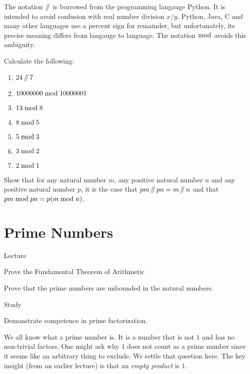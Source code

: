 The notation $\mathop{/\mkern-5mu/}$ is borrowed from the programming langauge Python. It is intended to avoid confusion with real number division $x/y$.
Python, Java, C and many other languages use a percent sign for remainder,
but unfortunately, its precise meaning differs from langauge to language. The notation $\bmod$ avoids this ambiguity.

\begin{exer}
\begin{exercise}
	\item Calculate the following:
		\begin{enumerate}
			\item $24\mathop{/\mkern-5mu/} 7$
			\item $10000000\bmod 10000001$
			\item $13\bmod 8$
			\item $8\bmod 5$
			\item $5\bmod 3$
			\item $3\bmod 2$
			\item $2\bmod 1$
		\end{enumerate}
	\item Show that for any natural number $m$, any positive natural number $n$ and any positive natural number $p$, 
	it is the case that $pm\mathop{/\mkern-5mu/} pn = m\mathop{/\mkern-5mu/} n$ 
	and that $pm\bmod pn = p(m\bmod n)$.
\end{exercise}
\end{exer}

\chapter{Prime Numbers}

\begin{goals}
	\begin{goal}{Lecture}
		\item Prove the Fundamental Theorem of Arithmetic
		\item Prove that the prime numbers are unbounded in the natural numbers.
	\end{goal}
	
	\begin{goal}{Study}
		\item Demonstrate competence in prime factorization.
	\end{goal}
\end{goals}


We all know what a prime number is. It is a number that is not $1$ and has no non-trivial 
factors. One might ask why $1$ does not count as a prime number since it seems
like an arbitrary thing to exclude.
We settle that question here. The key insight (from an earlier lecture)
is that an \emph{empty product} is $1$.

